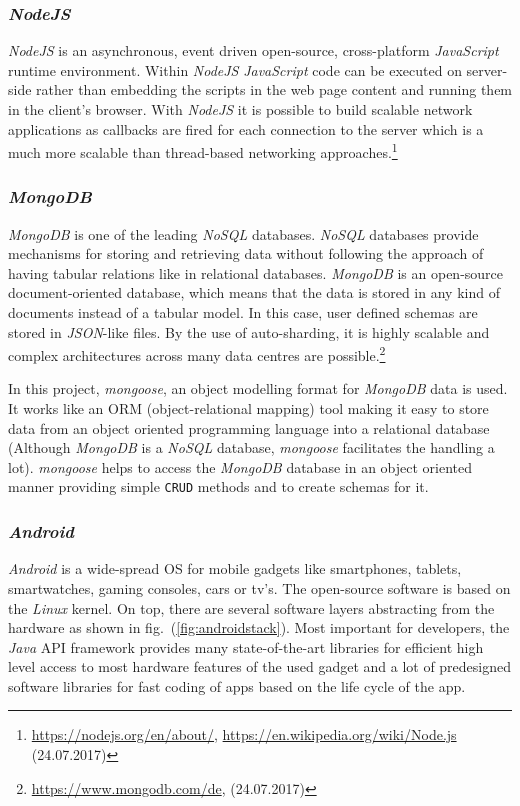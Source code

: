 \subsubsection{\textit{NodeJS}}
\label{subsubsec:nodejs}
\textit{NodeJS} is an asynchronous, event driven open-source, cross-platform \textit{JavaScript} runtime environment. Within \textit{NodeJS} \textit{JavaScript} code can be executed on server-side rather than embedding the scripts in the web page content and running them in the client's browser. With \textit{NodeJS} it is possible to build scalable network applications as callbacks are fired for each connection to the server which is a much more scalable than thread-based networking approaches.\footnote{\url{https://nodejs.org/en/about/}, \url{https://en.wikipedia.org/wiki/Node.js} (24.07.2017)}

\subsubsection{\textit{MongoDB}}
\label{subsubsec:mongodb}
\textit{MongoDB} is one of the leading \textit{NoSQL} databases. \textit{NoSQL} databases provide mechanisms for storing and retrieving data without following the approach of having tabular relations like in relational databases. \textit{MongoDB} is an open-source document-oriented database, which means that the data is stored in any kind of documents instead of a tabular model. In this case, user defined schemas are stored in \textit{JSON}-like files. By the use of auto-sharding, it is highly scalable and complex architectures across many data centres are possible.\footnote{\url{https://www.mongodb.com/de}, (24.07.2017)}

In this project, \textit{mongoose}, an object modelling format for \textit{MongoDB} data is used. It works like an ORM (object-relational mapping) tool making it easy to store data from an object oriented programming language into a relational database (Although \textit{MongoDB} is a \textit{NoSQL} database, \textit{mongoose} facilitates the handling a lot).  \textit{mongoose} helps to access the \textit{MongoDB} database in an object oriented manner providing simple \texttt{CRUD} methods and to create schemas for it. 

\subsubsection{\textit{Android}}
\label{subsubsec:android}
\textit{Android} is a wide-spread OS for mobile gadgets like smartphones, tablets, smartwatches, gaming consoles, cars or tv's. The open-source software is based on the \textit{Linux} kernel. On top, there are several software layers abstracting from the hardware as shown in fig.\ (\ref{fig:androidstack}). Most important for developers, the \textit{Java} API framework provides many state-of-the-art libraries for efficient high level access to most hardware features of the used gadget and a lot of predesigned software libraries for fast coding of apps based on the life cycle of the app.   

